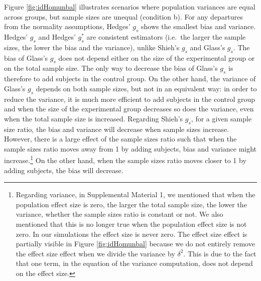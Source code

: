 \documentclass[
  english,
  man,floatsintext]{apa6}
\begin{document}
Figure \ref{fig:idHomunbal} illustrates scenarios where population variances are equal across groups, but sample sizes are unequal (condition b). For any departures from the normality assumptions, Hedges' \(g_s\) shows the smallest bias and variance. Hedges' \(g_s\) and Hedges' \(g^*_s\) are consistent estimators (i.e.~the larger the sample sizes, the lower the bias and the variance), unlike Shieh's \(g_s\) and Glass's \(g_s\). The bias of Glass's \(g_s\) does not depend either on the size of the experimental group or on the total sample size. The only way to decrease the bias of Glass's \(g_s\) is therefore to add subjects in the control group. On the other hand, the variance of Glass's \(g_s\) depends on both sample sizes, but not in an equivalent way: in order to reduce the variance, it is much more efficient to add subjects in the control group and when the size of the experimental group decreases so does the variance, even when the total sample size is increased. Regarding Shieh's \(g_s\), for a given sample size ratio, the bias and variance will decrease when sample sizes increase. However, there is a large effect of the sample sizes ratio such that when the sample sizes ratio moves away from 1 by adding subjects, bias and variance might increase.\footnote{Regarding variance, in Supplemental Material 1, we mentioned that when the population effect size is zero, the larger the total sample size, the lower the variance, whether the sample sizes ratio is constant or not. We also mentioned that this is no longer true when the population effect size is not zero. In our simulations the effect size is never zero. The effect size effect is partially visible in Figure \ref{fig:idHomunbal} because we do not entirely remove the effect size effect when we divide the variance by $\delta^2$. This is due to the fact that one term, in the equation of the variance computation, does not depend on the effect size.} On the other hand, when the sample sizes ratio moves closer to 1 by adding subjects, the bias will decrease.
\end{document}

